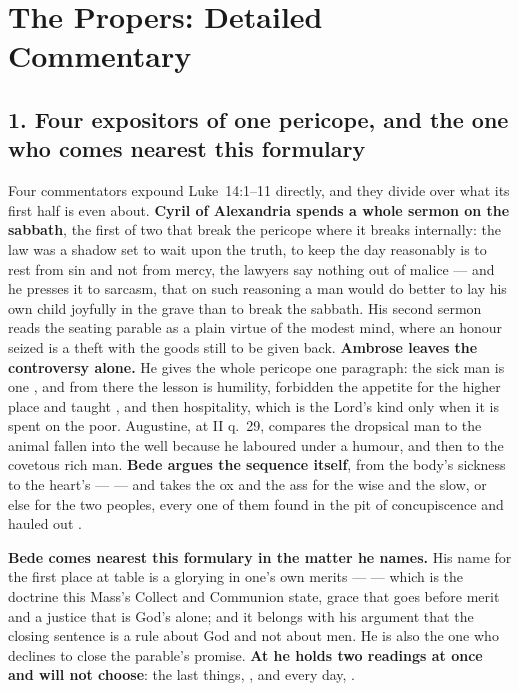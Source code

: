 \section*{The Propers: Detailed Commentary}

\subsection*{1. Four expositors of one pericope, and the one who comes nearest this formulary}

Four commentators expound Luke~14:1--11 directly, and they divide over what its
first half is even about. \textbf{Cyril of Alexandria spends a whole sermon on
the sabbath}, the first of two that break the pericope where it breaks
internally: the law was a shadow set to wait upon the truth, to keep the day
reasonably is to rest from sin and not from mercy, the lawyers say nothing out of
malice --- and he presses it to sarcasm, that on such reasoning a man would do
better to lay his own child joyfully in the grave than to break the sabbath. His second sermon reads the seating parable as a plain virtue of the
modest mind, where an honour seized is a theft with the goods still to be given
back. \textbf{Ambrose leaves
the controversy alone.} He gives the whole pericope one paragraph: the sick man
is one , and from there the lesson is humility, forbidden the
appetite for the higher place and taught , and then hospitality, which is the Lord's
kind only when it is spent on the poor. Augustine, at  II q.~29, compares the dropsical man to the animal fallen into the
well because he laboured under a humour, and then to the covetous rich man.
\textbf{Bede argues the sequence itself}, from the body's sickness to the
heart's ---  --- and takes the ox and the ass for the wise and the slow, or
else for the two peoples, every one of them found in the pit of concupiscence
and hauled out .

\textbf{Bede comes nearest this formulary in the matter he names.} His name for the
first place at table is a glorying in one's own merits ---  --- which is the doctrine this
Mass's Collect and Communion state, grace that goes before merit and a justice
that is God's alone; and it belongs with his argument that the closing sentence
is a rule about God and not about men. He is also the one who declines
to close the parable's promise. \textbf{At  he holds
two readings at once and will not choose}: the last things,
, and every day,
.

